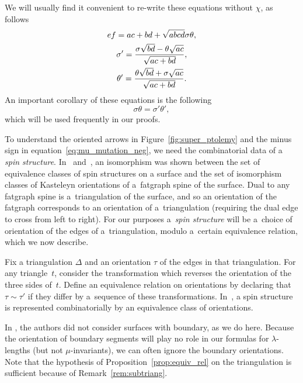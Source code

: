 We will usually find it convenient to re-write these equations without $\chi$, as follows
\begin{gather}
 ef = ac+bd+\sqrt{abcd} \sigma\theta, \label{eq:mutation}\\
 \sigma' = {{\sigma\sqrt{bd}-\theta\sqrt{ac}}\over{\sqrt{ac+bd}}}, \label{eq:mu_mutation_neg} \\
 \theta' = {{ \theta\sqrt{bd}+\sigma \sqrt{ac}}\over{\sqrt{ac+bd}}}.\label{eq:mu_mutation_pos}
\end{gather}
An important corollary of these equations is the following
\begin{equation}\label{eq:mu_cross}
	\sigma\theta=\sigma'\theta',
\end{equation}
which will be used frequently in our proofs.

To understand the oriented arrows in Figure~\ref{fig:super_ptolemy} and the minus sign in equation~\eqref{eq:mu_mutation_neg},
we need the combinatorial data of a \emph{spin structure}. In~\cite{cr_07} and~\cite{cr_08}, an isomorphism was shown between
the set of equivalence classes of spin structures on a surface and the set of isomorphism classes of Kasteleyn orientations
of a~fatgraph spine of the surface. Dual to any fatgraph spine is a~triangulation of the surface, and so an orientation of
the fatgraph corresponds to an orientation of a~triangulation (requiring the dual edge to cross from left to right). For our
purposes a~\emph{spin structure} will be a~choice of orientation of the edges of a~triangulation, modulo a~certain equivalence relation,
which we now describe.

Fix a triangulation $\Delta$ and an orientation $\tau$ of the edges in that triangulation. For any triangle~$t$,
consider the transformation which reverses the orientation of the three sides of~$t$. Define an equivalence relation on orientations by declaring that $\tau \sim \tau'$ if they differ by a~sequence of these transformations. In~\cite{pz_19}, a spin
structure is represented combinatorially by an equivalence class of orientations.

In \cite{pz_19}, the authors did not consider surfaces with boundary, as we do here. Because the orientation of boundary segments
will play no role in our formulas for $\lambda$-lengths (but not $\mu$-invariants), we can often ignore the boundary orientations.
Note that the hypothesis of Proposition~\ref{prop:equiv_rel} on the triangulation is sufficient because of Remark~\ref{rem:subtriang}.

